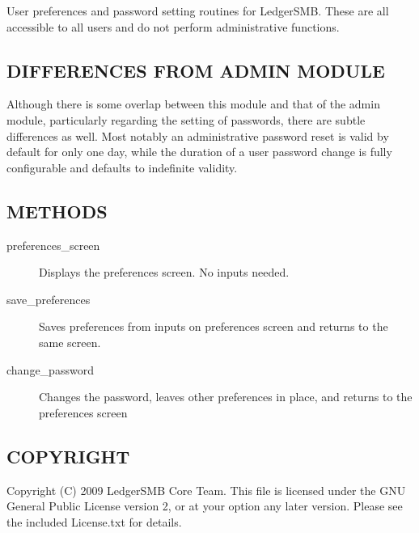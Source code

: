 \begin{description}
User preferences and password setting routines for LedgerSMB.  These are all
accessible to all users and do not perform administrative functions.

\subsection*{DIFFERENCES FROM ADMIN MODULE\label{LedgerSMB::Scripts::user_DIFFERENCES_FROM_ADMIN_MODULE}}


Although there is some overlap between this module and that of the admin module,
particularly regarding the setting of passwords, there are subtle differences as
well.  Most notably an administrative password reset is valid by default for
only one day, while the duration of a user password change is fully configurable
and defaults to indefinite validity.

\subsection*{METHODS\label{LedgerSMB::Scripts::user_METHODS}}
\begin{description}

\item[{preferences\_screen}] \mbox{}

Displays the preferences screen.  No inputs needed.


\item[{save\_preferences}] \mbox{}

Saves preferences from inputs on preferences screen and returns to the same
screen.


\item[{change\_password}] \mbox{}

Changes the password, leaves other preferences in place, and returns to the
preferences screen

\end{description}
\subsection*{COPYRIGHT\label{LedgerSMB::Scripts::user_COPYRIGHT}}


Copyright (C) 2009 LedgerSMB Core Team.  This file is licensed under the GNU 
General Public License version 2, or at your option any later version.  Please
see the included License.txt for details.


\end{description}

